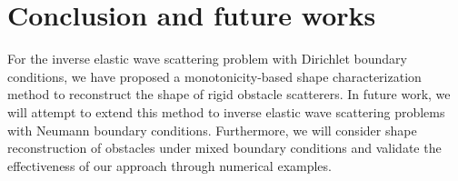 \documentclass[11pt,reqno,twoside]{amsart}
\theoremstyle{definition}
\theoremstyle{remark}
\numberwithin{equation}{section}
\begin{document}
\section{Conclusion and future works}

For the inverse elastic wave scattering problem with Dirichlet boundary conditions, we have proposed a monotonicity-based shape characterization method to reconstruct the shape of rigid obstacle scatterers. In future work, we will attempt to extend this method to inverse elastic wave scattering problems with Neumann boundary conditions. Furthermore, we will consider shape reconstruction of obstacles under mixed boundary conditions and validate the effectiveness of our approach through numerical examples.

























































\end{document}
